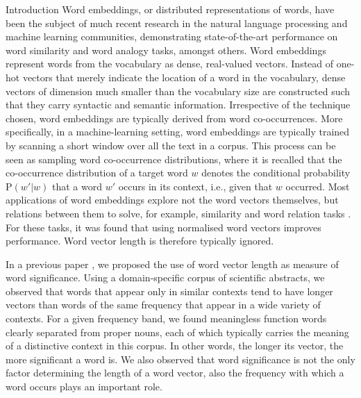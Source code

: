 \documentclass{article} %
\newcommand{\p}{\mathrm{P}}
\begin{document}
\begin{section}{Introduction}
Word embeddings, or distributed representations of words, have been the
subject of much recent research in the natural language processing and
machine learning communities, demonstrating state-of-the-art performance
on word similarity and word analogy tasks, amongst others.  Word
embeddings represent words from the vocabulary as dense, real-valued
vectors.  Instead of one-hot vectors that merely indicate the location
of a word in the vocabulary, dense vectors of dimension much smaller
than the vocabulary size are constructed such that they carry syntactic
and semantic information.  Irrespective of the technique chosen, word
embeddings are typically derived from word co-occurrences.  More
specifically, in a machine-learning setting, word embeddings are
typically trained by scanning a short window over all the text in a
corpus.  This process can be seen as sampling word co-occurrence
distributions, where it is recalled that the co-occurrence distribution
of a target word $w$ denotes the conditional probability $\p(w'|w)$ that
a word $w'$ occurs in its context, i.e., given that $w$ occurred.  Most
applications of word embeddings explore not the word vectors themselves,
but relations between them to solve, for example, similarity and word
relation tasks \cite{dontcountpredict}.  For these tasks, it
was found that using normalised word vectors improves performance.  Word
vector length is therefore typically ignored.

In a previous paper \cite{schakel-wilson}, we proposed the use of word
vector length as measure of word significance.  Using a domain-specific
corpus of scientific abstracts, we observed that words that appear only
in similar contexts tend to have longer vectors than words of the same
frequency that appear in a wide variety of contexts.  For a given
frequency band, we found meaningless function words clearly separated
from proper nouns, each of which typically carries the meaning of a
distinctive context in this corpus.  In other words, the longer its
vector, the more significant a word is.  We also observed that word
significance is not the only factor determining the length of a word
vector, also the frequency with which a word occurs plays an important
role.


\end{section}
\end{document}
